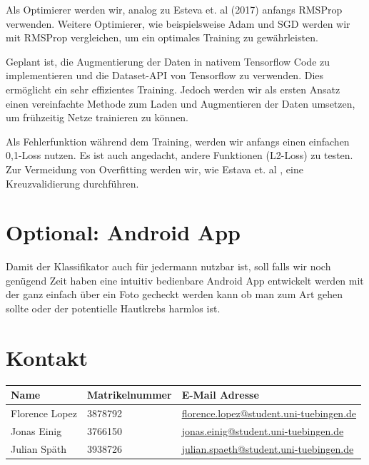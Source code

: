 \documentclass[%
   10pt,              %
   a4paper,           %
   DIV10,             %
]{scrartcl}%
\begin{document}
\noindent Als Optimierer werden wir, analog zu Esteva et. al (2017) \cite{skincancer} anfangs RMSProp verwenden. Weitere Optimierer, wie beispielsweise Adam und SGD werden wir mit RMSProp vergleichen, um ein optimales Training zu gewährleisten.

\noindent Geplant ist, die Augmentierung der Daten in nativem Tensorflow Code zu implementieren und die Dataset-API von Tensorflow zu verwenden. Dies ermöglicht ein sehr effizientes Training. Jedoch werden wir als ersten Ansatz einen vereinfachte Methode zum Laden und Augmentieren der Daten umsetzen, um frühzeitig Netze trainieren zu können.

\noindent Als Fehlerfunktion während dem Training, werden wir anfangs einen einfachen 0,1-Loss nutzen. Es ist auch angedacht, andere Funktionen (L2-Loss) zu testen. 
 Zur Vermeidung von Overfitting werden wir, wie Estava et. al \cite{skincancer}, eine Kreuzvalidierung durchführen. 

\section*{Optional: Android App}
Damit der Klassifikator auch für jedermann nutzbar ist, soll falls wir noch genügend Zeit haben eine intuitiv bedienbare Android App entwickelt werden mit der ganz einfach über ein Foto gecheckt werden kann ob man zum Art gehen sollte oder der potentielle Hautkrebs harmlos ist.

\section*{Kontakt}
\centering
\begin{tabular}{lll}
\toprule
Name & Matrikelnummer & E-Mail Adresse \\
\midrule
Florence Lopez & 3878792  &  \href{mailto:florence.lopez@student.uni-tuebingen.de}{florence.lopez@student.uni-tuebingen.de} \\
Jonas Einig  & 3766150    & \href{mailto:jonas.einig@student.uni-tuebingen.de}{jonas.einig@student.uni-tuebingen.de}    \\
Julian Späth  & 3938726    & \href{mailto:julian.spaeth@student.uni-tuebingen.de}{julian.spaeth@student.uni-tuebingen.de}    \\
\bottomrule
\end{tabular}



\end{document}
